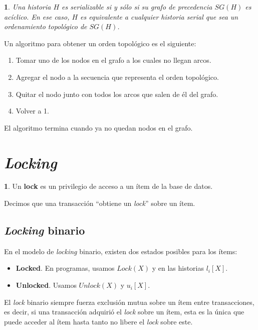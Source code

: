 \documentclass[english,titlepage]{article}
\newtheorem{thm}{\protect\theoremname}
\theoremstyle{definition}
\theoremstyle{definition}
\newtheorem*{defn*}{\protect\definitionname}
\providecommand{\definitionname}{Definición}
\providecommand{\theoremname}{Teorema}
\begin{document}
\begin{thm}
Una historia $H$ es serializable si y sólo si su grafo de precedencia $SG(H)$
es acíclico. En ese caso, $H$ es equivalente a cualquier historia serial que
sea un ordenamiento topológico de $SG(H)$.
\end{thm}

Un algoritmo para obtener un orden topológico es el siguiente:

\begin{enumerate}
    \item Tomar uno de los nodos en el grafo a los cuales no llegan arcos.
    \item Agregar el nodo a la secuencia que representa el orden topológico.
    \item Quitar el nodo junto con todos los arcos que salen de él del grafo.
    \item Volver a 1.
\end{enumerate}

El algoritmo termina cuando ya no quedan nodos en el grafo.

\section{\emph{Locking}}

\begin{defn*}
Un \textbf{lock} es un privilegio de acceso a un ítem de la base de datos.
\end{defn*}

Decimos que una transacción ``obtiene un \emph{lock}'' sobre un ítem.

\subsection{\emph{Locking} binario}

En el modelo de \emph{locking} binario, existen dos estados posibles para los
ítems:

\begin{itemize}
    \item \textbf{Locked}. En programas, usamos $Lock(X)$ y en las historias
        $l_i[X]$.
    \item \textbf{Unlocked}. Usamos $Unlock(X)$ y $u_i[X]$.
\end{itemize}

El \emph{lock} binario siempre fuerza exclusión mutua sobre un ítem entre
transacciones, es decir, si una transacción adquirió el \emph{lock} sobre un
ítem, esta es la única que puede acceder al ítem hasta tanto no libere el
\emph{lock} sobre este.
\end{document}
